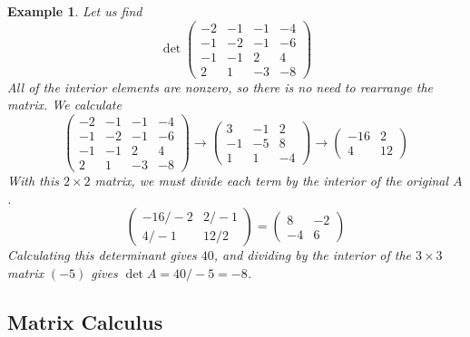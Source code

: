 \documentclass{article}
\newtheorem{example}{Example}[section]
\theoremstyle{remark}
\theoremstyle{definition}
\begin{document}
    \begin{example}
    Let us find
    \[\det{\begin{pmatrix}
    -2&-1&-1&-4\\-1&-2&-1&-6\\-1&-1&2&4\\2&1&-3&-8
    \end{pmatrix}}\]
    All of the interior elements are nonzero, so there is no need to rearrange the matrix. We calculate
    \[\begin{pmatrix}
    -2&-1&-1&-4\\-1&-2&-1&-6\\-1&-1&2&4\\2&1&-3&-8
    \end{pmatrix} \rightarrow \begin{pmatrix}
    3&-1&2\\-1&-5&8\\1&1&-4
    \end{pmatrix} \rightarrow \begin{pmatrix}
    -16&2\\4&12
    \end{pmatrix}\]
    With this $2 \times 2$ matrix, we must divide each term by the interior of the original $A$. 
    \[\begin{pmatrix}
    -16/-2 & 2/-1\\4/-1 & 12/2
    \end{pmatrix} = \begin{pmatrix}
    8&-2\\-4&6
    \end{pmatrix}\]
    Calculating this determinant gives $40$, and dividing by the interior of the $3 \times 3$ matrix $(-5)$ gives $\det{A} = 40/-5 = -8$. 
    \end{example}

  \subsection{Matrix Calculus}
\end{document}
